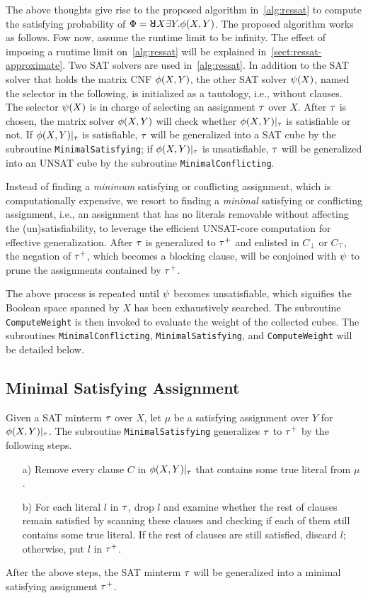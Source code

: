 The above thoughts give rise to the proposed algorithm in~\cref{alg:ressat} to compute the satisfying probability of $\Qf=\random{} X \exists Y.\pf(X,Y)$.
The proposed algorithm works as follows.
Fow now, assume the runtime limit \timeout to be infinity.
The effect of imposing a runtime limit on~\cref{alg:ressat} will be explained in~\cref{sect:ressat-approximate}.
Two SAT solvers are used in~\cref{alg:ressat}.
In addition to the SAT solver that holds the matrix CNF $\phi(X,Y)$,
the other SAT solver $\psi(X)$, named the selector in the following,
is initialized as a tautology, i.e., without clauses.
The selector $\psi(X)$ is in charge of selecting an assignment $\tau$ over $X$.
After $\tau$ is chosen, the matrix solver $\phi(X,Y)$ will check whether $\phi(X,Y)|_{\tau}$ is satisfiable or not.
If $\phi(X,Y)|_{\tau}$ is satisfiable,
$\tau$ will be generalized into a SAT cube by the subroutine \texttt{MinimalSatisfying};
if $\phi(X,Y)|_{\tau}$ is unsatisfiable,
$\tau$ will be generalized into an UNSAT cube by the subroutine \texttt{MinimalConflicting}.

Instead of finding a \textit{minimum} satisfying or conflicting assignment,
which is computationally expensive,
we resort to finding a \textit{minimal} satisfying or conflicting assignment,
i.e., an assignment that has no literals removable without affecting the (un)satisfiability,
to leverage the efficient UNSAT-core computation for effective generalization.
After $\tau$ is generalized to $\tau^+$ and enlisted in $C_\bot$ or $C_\top$,
the negation of $\tau^+$, which becomes a blocking clause,
will be conjoined with $\psi$ to prune the assignments contained by $\tau^+$.

The above process is repeated until $\psi$ becomes unsatisfiable,
which signifies the Boolean space spanned by $X$ has been exhaustively searched.
The subroutine \texttt{ComputeWeight} is then invoked to evaluate the weight of the collected cubes.
The subroutines \texttt{MinimalConflicting}, \texttt{MinimalSatisfying}, and \texttt{ComputeWeight} will be detailed below.

\subsection{Minimal Satisfying Assignment}
Given a SAT minterm $\tau$ over $X$,
let $\mu$ be a satisfying assignment over $Y$ for $\phi(X,Y)|_{\tau}$.
The subroutine \texttt{MinimalSatisfying} generalizes $\tau$ to $\tau^+$ by the following steps.
\begin{itemize}
    \item[a)] Remove every clause $C$ in $\phi(X,Y)|_{\tau}$ that contains some true literal from $\mu$.
    \item[b)] For each literal $l$ in $\tau$, drop $l$ and examine whether the rest of clauses remain satisfied
          by scanning these clauses and checking if each of them still contains some true literal.
          If the rest of clauses are still satisfied, discard $l$; otherwise, put $l$ in $\tau^+$.
\end{itemize}
After the above steps, the SAT minterm $\tau$ will be generalized into a minimal satisfying assignment $\tau^+$.

